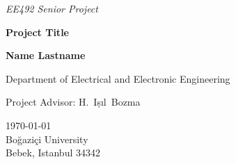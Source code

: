 \documentclass[10pt]{article} %
\begin{document}
       
  
\pagestyle{empty}


\centerline{\large \textsl{ EE492 Senior Project} }
\vskip 5mm

\vspace*{3cm}
\centerline{\Large \bf  Project Title }
\vskip 2cm

\centerline{\large\bf  Name Lastname} 

\vspace*{2cm}
\begin{center}
{\large\rm  Department of Electrical and Electronic Engineering}
\end{center}

\vskip 2cm
\begin{center}
{\large\rm  Project Advisor:  H.~I\d{s}{\i}l~Bozma}
\end{center}  

\vspace*{2cm}
\begin{center}
\today \\[2cm]
{Bo\u{g}azi\c{c}i University}\\[5mm]
{\large\rm      Bebek, Istanbul 34342} \\
\end{center}





\newpage


\newpage
\tableofcontents

\newpage
\listoffigures
\listoftables

\newpage
\pagestyle{plain}
\setcounter{page}{1}








 


%
\end{document}
